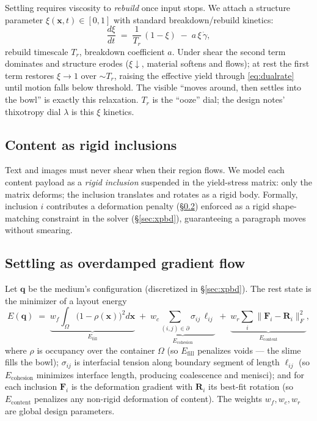 \documentclass[11pt]{article}
\newcommand{\rate}{\dot{\gamma}}
\begin{document}
Settling requires viscosity to \emph{rebuild} once input stops. We attach a structure
parameter $\xi(\mathbf{x},t)\in[0,1]$ with standard breakdown/rebuild kinetics:
\begin{equation}
\frac{d\xi}{dt} \;=\; \frac{1}{T_r}\,(1-\xi)\;-\;a\,\xi\,\rate,
\label{eq:thixo}
\end{equation}
rebuild timescale $T_r$, breakdown coefficient $a$. Under shear the second term dominates and
structure erodes ($\xi\downarrow$, material softens and flows); at rest the first term restores
$\xi\to1$ over $\sim T_r$, raising the effective yield through \eqref{eq:dualrate} until motion
falls below threshold. The visible ``moves around, then settles into the bowl'' is exactly this
relaxation. $T_r$ is the ``ooze'' dial; the design notes' thixotropy dial $\lambda$ is this $\xi$
kinetics.

\subsection{Content as rigid inclusions}\label{sec:inclusions}

Text and images must never shear when their region flows. We model each content payload as a
\emph{rigid inclusion} suspended in the yield-stress matrix: only the matrix deforms; the
inclusion translates and rotates as a rigid body. Formally, inclusion $i$ contributes a
deformation penalty (\S\ref{sec:energy}) enforced as a rigid shape-matching constraint in the
solver (\S\ref{sec:xpbd}), guaranteeing a paragraph moves without smearing.

\subsection{Settling as overdamped gradient flow}\label{sec:energy}

Let $\mathbf{q}$ be the medium's configuration (discretized in \S\ref{sec:xpbd}). The rest state
is the minimizer of a layout energy
\begin{equation}
E(\mathbf{q}) \;=\;
\underbrace{w_f\!\int_{\Omega}\!\big(1-\rho(\mathbf{x})\big)^2 d\mathbf{x}}_{E_{\text{fill}}}
\;+\;
\underbrace{w_c\!\sum_{(i,j)\in\partial}\!\sigma_{ij}\,\ell_{ij}}_{E_{\text{cohesion}}}
\;+\;
\underbrace{w_r\!\sum_i \big\lVert \mathbf{F}_i-\mathbf{R}_i\big\rVert_F^2}_{E_{\text{content}}},
\label{eq:energy}
\end{equation}
where $\rho$ is occupancy over the container $\Omega$ (so $E_{\text{fill}}$ penalizes voids ---
the slime fills the bowl); $\sigma_{ij}$ is interfacial tension along boundary segment of length
$\ell_{ij}$ (so $E_{\text{cohesion}}$ minimizes interface length, producing coalescence and
menisci); and for each inclusion $\mathbf{F}_i$ is the deformation gradient with $\mathbf{R}_i$
its best-fit rotation (so $E_{\text{content}}$ penalizes any non-rigid deformation of content).
The weights $w_f,w_c,w_r$ are global design parameters.
\end{document}
